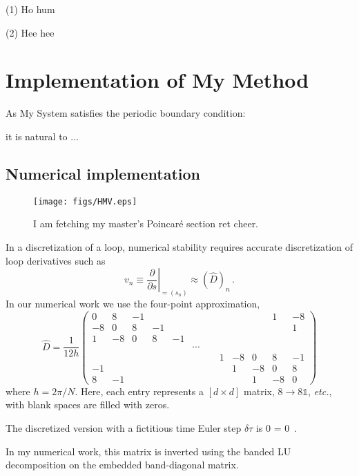 \documentclass[pre,twocolumn,groupedaddress,showpacs,showkeys]{revtex4}
\begin{document}
(1) Ho hum

(2) Hee hee
 
 
\section{Implementation of My Method}
\label{sec:nm}

    As My System satisfies the  periodic boundary condition:

 
it is natural to ...

\subsection{Numerical implementation}

%
\begin{figure}[t!]
	\texttt{[image: figs/HMV.eps]}
\caption{
 I am fetching my master's Poincar\'e section ret cheer.
        }
\label{f:Poinc}
\end{figure}  

    In a discretization of a loop, numerical
stability requires accurate  
discretization of  loop derivatives such as
 \[
v_n \equiv
\left.\frac{\partial }{\partial s}\right|_{ = (s_n)}
	\approx (\hat{D})_n
\,.
\]
In our numerical work we use the four-point approximation,
{\small 
\[ 
\hat{D} = 
\frac{1}{12h}
\!
\left( \begin{array}{ccccccccccc} 0&8&-1&&&\qquad
&&&&1&-8 \\ -8&0&8&-1&&\qquad &&&&&1 \\ 1&-8&0&8&-1&\qquad &&&&&\\
&&&&&\cdots&&&&&\\
&&&&&\qquad &1&-8&0&8&-1 \\
-1&&&&&\qquad &&1&-8&0&8 \\
8&-1&&&&\qquad &&&1&-8&0 
\end{array}\right)
\]
}%
where $h={2 \pi}/{N}$. 
Here, each entry represents a $[d\! \times\! d ]$ matrix, $8 \to 8\mathds{1}$, 
{\em etc.}, 
with blank spaces are filled with zeros.  

The discretized version
with a fictitious time Euler step $\delta \tau$ is
\beq
\MatrixII
 {\hat{\Mvar}}{}
 {}{0} 
=\delta \tau {} {0}
\,. 
\label{mform} 
\eeq

    In my numerical work,
this matrix is inverted using the banded LU decomposition 
on the embedded
band-diagonal matrix.
\end{document}

